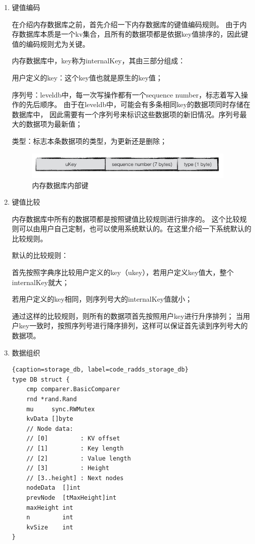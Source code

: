 		\begin{enumerate}
			\item 键值编码
			
			在介绍内存数据库之前，首先介绍一下内存数据库的键值编码规则。
			由于内存数据库本质是一个kv集合，且所有的数据项都是依据key值排序的，因此键值的编码规则尤为关键。

			内存数据库中，key称为internalKey，其由三部分组成：

			用户定义的key：这个key值也就是原生的key值；
			
			序列号：leveldb中，每一次写操作都有一个sequence number，标志着写入操作的先后顺序。
			由于在leveldb中，可能会有多条相同key的数据项同时存储在数据库中，
			因此需要有一个序列号来标识这些数据项的新旧情况。序列号最大的数据项为最新值；
			
			类型：标志本条数据项的类型，为更新还是删除；

			\begin{figure}[H]
				\centering
				\includegraphics[width=0.95\textwidth]{images/internalkey}
				\caption{内存数据库内部键}
				\label{internalkey}
			\end{figure}

			\item 键值比较
			
			内存数据库中所有的数据项都是按照键值比较规则进行排序的。
			这个比较规则可以由用户自己定制，也可以使用系统默认的。在这里介绍一下系统默认的比较规则。

			默认的比较规则：

			首先按照字典序比较用户定义的key（ukey），若用户定义key值大，整个internalKey就大；
			
			若用户定义的key相同，则序列号大的internalKey值就小；
			
			通过这样的比较规则，则所有的数据项首先按照用户key进行升序排列；
			当用户key一致时，按照序列号进行降序排列，这样可以保证首先读到序列号大的数据项。


			\item 数据组织
			
			\begin{lstlisting}{caption=storage_db, label=code_radds_storage_db}
type DB struct {
	cmp comparer.BasicComparer
	rnd *rand.Rand
	mu     sync.RWMutex
	kvData []byte
	// Node data:
	// [0]         : KV offset
	// [1]         : Key length
	// [2]         : Value length
	// [3]         : Height
	// [3..height] : Next nodes
	nodeData  []int
	prevNode  [tMaxHeight]int
	maxHeight int
	n         int
	kvSize    int
}
		\end{lstlisting}
				

\end{enumerate}
